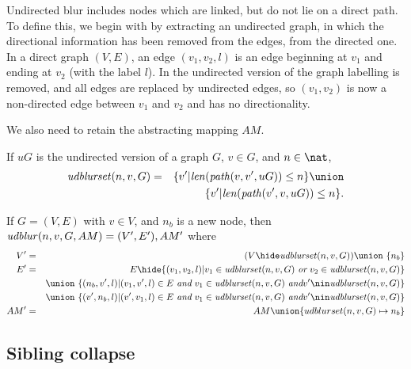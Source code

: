 \documentclass{elsarticle}
\begin{document}
Undirected blur includes nodes which are linked, but do not lie on a direct path. 
%
To define this, we begin with by extracting an undirected graph, in which the directional information has been removed from the edges, from the directed one. In a direct graph $(V,E)$, an edge $(v_1,v_2,l)$ is an edge beginning at $v_1$ and ending at $v_2$ (with the label $l$). In the undirected version of the graph labelling is removed, and all edges are replaced by undirected edges, so $(v_1,v_2)$ is now a non-directed edge between $v_1$ and $v_2$ and has no directionality.

We also need to retain the abstracting mapping $AM$. 




\begin{definition} \label{def:undirected-blurset}
  If $uG$ is the undirected version of a graph $G$, $v \in G$, and $n \in \nat$,
  \begin{eqnarray*}
    \udblurset(n,v,G) & = & \{v'|\len(\Path(v,v',uG)) \leq n\}\union \\
                     &   & \{v'|\len(\Path(v',v,uG)) \leq n\}.
  \end{eqnarray*}
\end{definition}

\begin{definition} \label{def:undirected-blur}
  If $G = (V,E)$ with $v \in V$, and $n_b$ is a new node, then $\mathit{udblur}(n,v,G,AM) = (V',E'),AM'$ where
  \begin{eqnarray*}
  V' &=& (V\hide \udblurset(n,v,G)) \union\ \{n_b\}\\
  E' &=& E\hide \{(v_1,v_2,l)| v_1 \in \udblurset(n,v,G) ~\emph{or}~ v_2 \in \udblurset(n,v,G)\}\\
  &&\union\ \{(n_b,v',l)|(v_1,v',l) \in E ~\emph{and}~ v_1 \in \udblurset(n,v,G)  ~\emph{and} v' \nin \udblurset(n,v,G) \} \\
  &&\union\ \{(v',n_b,l)|(v',v_1,l) \in E ~\emph{and}~ v_1 \in \udblurset(n,v,G)  ~\emph{and} v' \nin \udblurset(n,v,G) \} \\
  AM' & = & AM \union \{udblurset(n,v,G) \mapsto n_b\}
  \end{eqnarray*}
\end{definition}



\subsection{Sibling collapse}
\end{document}
